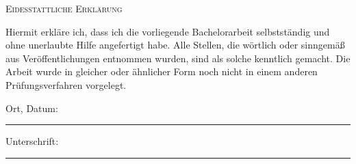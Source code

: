 \begin{center}
  \textsc{Eidesstattliche Erklärung}
\end{center}
Hiermit erkläre ich, dass ich die vorliegende Bachelorarbeit selbstständig und ohne unerlaubte Hilfe angefertigt habe. Alle Stellen, die wörtlich oder sinngemäß aus Veröffentlichungen entnommen wurden, sind als solche kenntlich gemacht. Die Arbeit wurde in gleicher oder ähnlicher Form noch nicht in einem anderen Prüfungsverfahren vorgelegt.
\vspace{2cm}

\noindent
Ort, Datum: \rule{6cm}{0.4pt}

\vspace{1cm}

\noindent
Unterschrift: \rule{6cm}{0.4pt}
